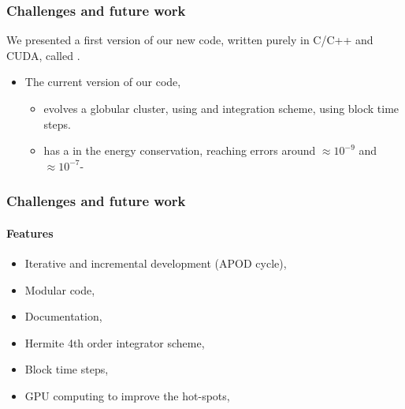 \begin{frame}
    \frametitle{Challenges and future work}

    We presented a first version of our new {\nbody} code,
    written purely in C/C++ and CUDA, called \red{\GR}.

    \begin{itemize}
        \item The current version of our code,
        \begin{itemize}
            \item evolves a globular cluster, using and 
                integration scheme, using block time steps.
            \item has a  in the energy conservation,
                reaching errors around $\approx 10^{-9}$ and $\approx 10^{-7}$-
        \end{itemize}
    \end{itemize}

\end{frame}

\begin{frame}
    \frametitle{Challenges and future work}
    \framesubtitle{Features}

    \begin{itemize}
        \item Iterative and incremental development (APOD cycle),
        \item Modular code,
        \item Documentation,
        \item Hermite 4th order integrator scheme,
        \item Block time steps,
        \item GPU computing to improve the hot-spots,
    \end{itemize}
\end{frame}

